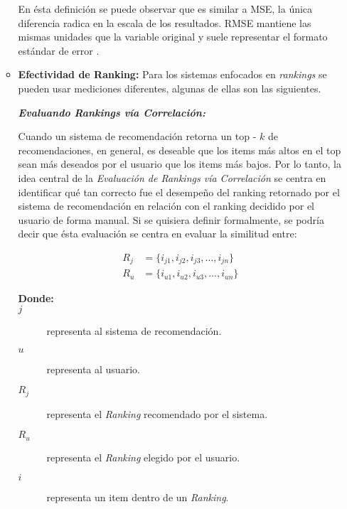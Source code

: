 \begin{itemize}
\begin{itemize}[label=$\diamond$]
            En ésta definición se puede observar que es similar a MSE, la única diferencia radica en la escala de los resultados. RMSE mantiene las mismas unidades que la variable original y suele representar el formato estándar de error \parencite{gmd-15-5481-2022}.

            \newpage
            \thispagestyle{plain}
            \vspace*{0.2cm}

            \item \textbf{Efectividad de Ranking: } Para los sistemas enfocados en \textit{rankings} se pueden usar mediciones diferentes, algunas de ellas son las siguientes.
            
            \textbf{\textit{Evaluando Rankings vía Correlación: }}

            Cuando un sistema de recomendación retorna un top - $k$ de recomendaciones, en general, es deseable que los items más altos en el top sean más deseados por el usuario que los items más bajos.
            Por lo tanto, la idea central de la \textit{Evaluación de Rankings vía Correlación} se centra en identificar qué tan correcto fue el desempeño del ranking retornado por el sistema de recomendación en relación con el ranking decidido por el usuario de forma manual. 
            Si se quisiera definir formalmente, se podría decir que ésta evaluación se centra en evaluar la similitud entre:

            \begin{equation}
                \begin{split}
                    R_j &= \{ i_{j1}, i_{j2}, i_{j3}, ..., i_{jn} \}\\
                    R_u &= \{ i_{u1}, i_{u2}, i_{u3}, ..., i_{un} \}
                \end{split}
            \end{equation}  

            \begin{description}
                \item[\textbf{Donde:}]
                \item[$j$] representa al sistema de recomendación.
                \item[$u$] representa al usuario.
                \item[$R_j$] representa el \textit{Ranking} recomendado por el sistema.
                \item[$R_u$] representa el \textit{Ranking} elegido por el usuario.
                \item[$i$]  representa un item dentro de un \textit{Ranking}.      
            \end{description}


\end{itemize}
\end{itemize}
